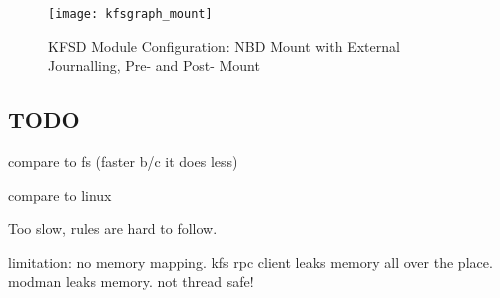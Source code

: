 \begin{figure}[htb]
\begin{center}
  \texttt{[image: kfsgraph\_mount]}
  \caption{KFSD Module Configuration: NBD Mount with External Journalling, Pre- and Post- Mount}
  \label{fig:kfsgraph-mount}
\end{center}
\end{figure}


\subsection{TODO}

compare to fs (faster b/c it does less)

compare to linux

Too slow, rules are hard to follow.

limitation: no memory mapping. kfs rpc client leaks memory all over
the place. modman leaks memory. not thread safe!
